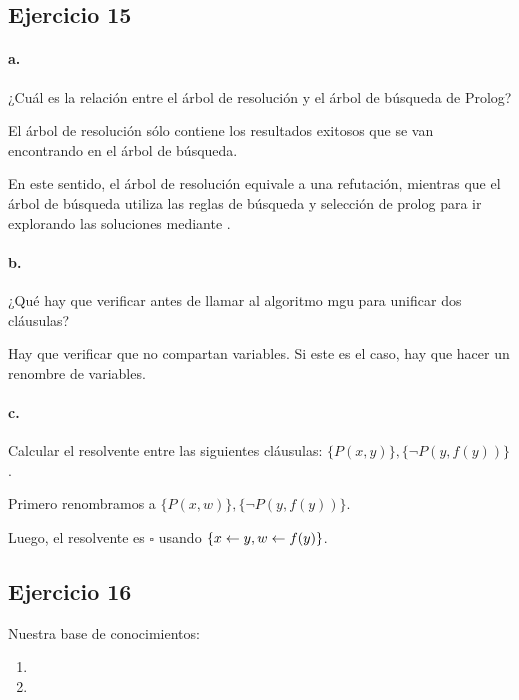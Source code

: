 \subsection*{Ejercicio 15}

\paragraph{a.} ¿Cuál es la relación entre el árbol de resolución y el árbol de búsqueda de Prolog?

El árbol de resolución sólo contiene los resultados exitosos que se van encontrando en el árbol de búsqueda.

En este sentido, el árbol de resolución equivale a una refutación, mientras que el árbol de búsqueda utiliza las reglas de búsqueda y selección de prolog para ir explorando las soluciones mediante .


\paragraph{b.} ¿Qué hay que verificar antes de llamar al algoritmo mgu para unificar dos cláusulas?

Hay que verificar que no compartan variables. Si este es el caso, hay que hacer un renombre de variables.


\paragraph{c.} Calcular el resolvente entre las siguientes cláusulas: $\{P (x, y)\}, \{\lnot P (y, f (y))\}$.

Primero renombramos a $\{P (x, w)\}, \{\lnot P (y, f (y))\}$.

Luego, el resolvente es $\square$ usando $\{x\leftarrow y, w\leftarrow f(y)\}$.

\subsection*{Ejercicio 16}

Nuestra base de conocimientos:

\begin{enumerate}
  \item {}
  \item {}
\end{enumerate}

